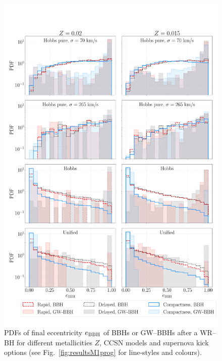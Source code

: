 \documentclass[a4paper,titlepage]{book}     	%
\begin{document}
\begin{figure}[h!]
	\centering
	\includegraphics[width=\textwidth]{./images/remeccentricity.pdf}	
	\caption{PDFs of final eccentricity $e_{\rm BBH}$ of BBHs or GW--BBHs after a WR--BH for different metallicities $Z$, CCSN models and supernova kick options (see Fig.\ \ref{fig:resultsM1prog} for line-styles and colours).}\label{fig:resultsRemEccentricity}
\end{figure}
\end{document}

